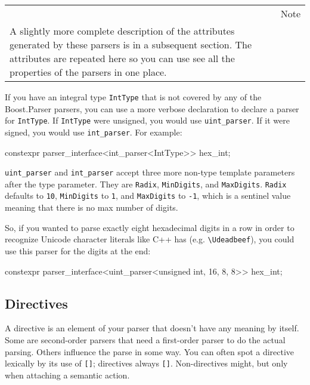 \begin{longtable}[]{@{}
  >{\raggedright\arraybackslash}p{}
  >{\raggedright\arraybackslash}p{}@{}}
\toprule\noalign{}
\endhead
\bottomrule\noalign{}
\endlastfoot
\begin{minipage}[t]{\linewidth}\raggedright
\end{minipage} & Note \\
A slightly more complete description of the attributes generated by these parsers is in a subsequent section. The attributes are repeated here so you can use see all the properties of the parsers in one place. & \\
\end{longtable}

If you have an integral type \texttt{IntType} that is not covered by any of the Boost.Parser parsers, you can use a more verbose declaration to declare a parser for \texttt{IntType}. If \texttt{IntType} were unsigned, you would use \texttt{uint\_parser}. If it were signed, you would use \texttt{int\_parser}. For example:

\begin{code}
constexpr parser_interface<int_parser<IntType>> hex_int;
\end{code}

\texttt{uint\_parser} and \texttt{int\_parser} accept three more non-type template parameters after the type parameter. They are \texttt{Radix}, \texttt{MinDigits}, and \texttt{MaxDigits}. \texttt{Radix} defaults to \texttt{10}, \texttt{MinDigits} to \texttt{1}, and \texttt{MaxDigits} to \texttt{-1}, which is a sentinel value meaning that there is no max number of digits.

So, if you wanted to parse exactly eight hexadecimal digits in a row in order to recognize Unicode character literals like C++ has (e.g. \texttt{\textbackslash{}Udeadbeef}), you could use this parser for the digits at the end:

\begin{code}
constexpr parser_interface<uint_parser<unsigned int, 16, 8, 8>> hex_int;
\end{code}

\subsection{Directives}

A directive is an element of your parser that doesn't have any meaning by itself. Some are second-order parsers that need a first-order parser to do the actual parsing. Others influence the parse in some way. You can often spot a directive lexically by its use of \texttt{{[}{]}}; directives always \texttt{{[}{]}}. Non-directives might, but only when attaching a semantic action.

